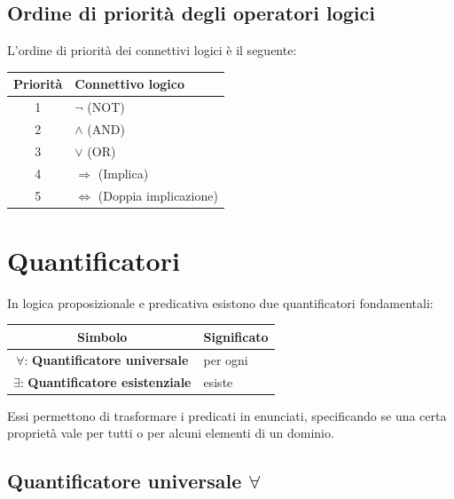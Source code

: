 \subsection{Ordine di priorità degli operatori logici }

L'ordine di priorità dei connettivi logici è il seguente:
\begin{center}
\begin{tabular}{c|l}
  \textbf{Priorità} & \textbf{Connettivo logico} \\
  \hline
  1 & \( \neg \)  (NOT) \\
  2 & \( \land \)  (AND) \\
  3 & \( \lor \)  (OR) \\
  4 & \( \Rightarrow \)  (Implica) \\
  5 & \( \iff \)  (Doppia implicazione) \\
\end{tabular}
\end{center}




\section{Quantificatori}

In logica proposizionale e predicativa esistono due quantificatori fondamentali:
\begin{center}
    
\begin{tabular}{c|l}
   \textbf{Simbolo} & \textbf{Significato} \\
  \hline
  \( \forall \):  \textbf{ Quantificatore universale} & per ogni \\
\( \exists \): \textbf{ Quantificatore esistenziale}   & esiste \\
\end{tabular}
\end{center}

Essi permettono di trasformare i predicati in enunciati, specificando se una certa proprietà vale per tutti o per alcuni elementi di un dominio.

\subsection{Quantificatore universale \texorpdfstring{$\forall$}{forall}}



